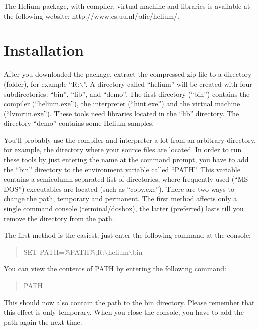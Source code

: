 \documentclass[pdftex,11pt,a4paper,notitlepage]{article}
\begin{document}
        The Helium package, with compiler, virtual machine and libraries is
        available at the following website:
        \mbox{http://www.cs.uu.nl/$\,\tilde{}$afie/helium/}.


    \section{Installation}
        
        After you downloaded the package, extract the compressed zip file to
        a directory (folder), for example ``R:$\backslash$''.
        A directory called ``helium'' will be created with four
        subdirectories: ``bin'', ``lib'',  and ``demo''. The first
        directory (``bin'') contains the compiler (``helium.exe''), 
        the interpreter (``hint.exe'') and the
        virtual machine (``lvmrun.exe''). These tools need libraries located
        in the ``lib'' directory. The directory ``demo'' contains some Helium
        samples.
        
        You'll probably use the compiler and interpreter a lot from an
        arbitrary directory, for example, the directory where your source
        files are located. In order to run these tools by just entering the
        name at the command prompt, you have to add the ``bin'' directory
        to the environment variable called ``PATH''. This variable contains
        a semicolumn separated list of directories, where frequently used
        (``MS-DOS'') executables are located (such as ``copy.exe''). There
        are two ways to change the path, temporary and permanent. The first
        method affects only a single command console (terminal/dosbox), the
        latter (preferred) lasts till you remove the directory from the path.
        
        The first method is the easiest, just enter the following command
        at the console:
        \begin{quote}
        SET PATH=\%PATH\%;R:$\backslash$helium$\backslash$bin
        \end{quote}
        You can view the contents of PATH by entering the following command:
        \begin{quote}
        PATH
        \end{quote}
        This should now also contain the path to the bin directory.
        Please remember that this effect is only temporary. When you close the
        console, you have to add the path again the next time.
        
\end{document}
